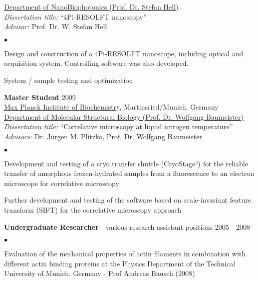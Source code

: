 \documentclass[margin,line]{res}
\newenvironment{list2}{
  \begin{list}{$\bullet$}{%
      \setlength{\itemsep}{0in}
      \setlength{\parsep}{0in} \setlength{\parskip}{0in}
      \setlength{\topsep}{0in} \setlength{\partopsep}{0in} 
      \setlength{\leftmargin}{0.2in}}}{\end{list}}
\begin{document}
\begin{resume}
\href{http://www.4pi.de/}{Department of NanoBiophotonics (Prof. Dr. Stefan Hell)}\\
{\it Dissertation title:} “4Pi-RESOLFT nanoscopy”\\
{\it Advisor:} Prof. Dr. W. Stefan Hell\\
\vspace*{-1mm}
\begin{list2}
\vspace*{-1mm}
\item Design and construction of a 4Pi-RESOLFT nanoscope, including optical and acquisition system. Controlling software was also developed. 
\item System / sample testing and optimization
\end{list2}
{\bf Master Student} \hfill {2009}\\
\href{https://www.biochem.mpg.de/en}{Max Planck Institute of Biochemistry}, Martinsried/Munich, Germany\\
\href{https://www.biochem.mpg.de/baumeister}{Department of Molecular Structural Biology (Prof. Dr. Wolfgang Baumeister)}\\
{\it Dissertation title:} “Correlative microscopy at liquid nitrogen temperature”\\
{\it Advisors:} Dr. Jürgen M. Plitzko, Prof. Dr. Wolfgang Baumeister\\
\vspace*{-1mm}
\begin{list2}
\vspace*{-1mm}
\item Development and testing of a cryo transfer shuttle (CryoStage²) for the reliable transfer of amorphous frozen-hydrated samples from a fluorescence to an electron microscope  for correlative microscopy
\item Further development and testing of the software based on scale-invariant feature transform (SIFT) for the correlative microscopy approach
\end{list2}
{\bf Undergraduate Researcher} - various research assistant positions \hfill {2005 - 2008}\\
\vspace*{-1mm}
\begin{list2}
\vspace*{-1mm}
\item Evaluation of the mechanical properties of actin filaments in combination with different actin binding proteins at the Physics Department of the Technical University of Munich, Germany - Prof Andreas Bausch (2008)

\end{list2}
\end{resume}
\end{document}
